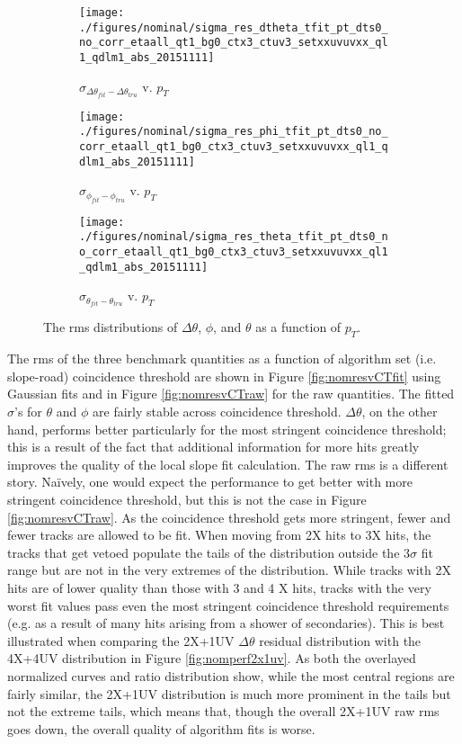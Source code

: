 \begin{figure}[!htbp]\captionsetup{justification=centering}\captionsetup{justification=centering}
  \begin{center}
  \begin{subfigure}{0.3\textwidth}\texttt{[image: ./figures/nominal/sigma\_res\_dtheta\_tfit\_pt\_dts0\_no\_corr\_etaall\_qt1\_bg0\_ctx3\_ctuv3\_setxxuvuvxx\_ql1\_qdlm1\_abs\_20151111]}\caption{$\sigma_{\Delta\theta_{fit}-\Delta\theta_{tru}}$ v. $p_T$}\end{subfigure}
  \begin{subfigure}{0.3\textwidth}\texttt{[image: ./figures/nominal/sigma\_res\_phi\_tfit\_pt\_dts0\_no\_corr\_etaall\_qt1\_bg0\_ctx3\_ctuv3\_setxxuvuvxx\_ql1\_qdlm1\_abs\_20151111]}\caption{$\sigma_{\phi_{fit}-\phi_{tru}}$ v. $p_T$}\end{subfigure}
  \begin{subfigure}{0.3\textwidth}\texttt{[image: ./figures/nominal/sigma\_res\_theta\_tfit\_pt\_dts0\_no\_corr\_etaall\_qt1\_bg0\_ctx3\_ctuv3\_setxxuvuvxx\_ql1\_qdlm1\_abs\_20151111]}\caption{$\sigma_{\theta_{fit}-\theta_{tru}}$ v. $p_T$}\end{subfigure}
  \caption{\label{fig:nomresvpt} The rms distributions of $\Delta\theta$, $\phi$, and $\theta$ as a function of $p_T$.}
  \end{center}
\end{figure}

The rms of the three benchmark quantities as a function of algorithm set (i.e. slope-road) coincidence threshold are shown in Figure \ref{fig:nomresvCTfit} using Gaussian fits and in Figure \ref{fig:nomresvCTraw} for the raw quantities.  The fitted $\sigma$'s for $\theta$ and $\phi$ are fairly stable across coincidence threshold.  $\Delta\theta$, on the other hand, performs better particularly for the most stringent coincidence threshold; this is a result of the fact that additional information for more hits greatly improves the quality of the local slope fit calculation.  The raw rms is a different story.  Na\"ively, one would expect the performance to get better with more stringent coincidence threshold, but this is not the case in Figure \ref{fig:nomresvCTraw}.  As the coincidence threshold gets more stringent, fewer and fewer tracks are allowed to be fit.  When moving from 2X hits to 3X hits, the tracks that get vetoed populate the tails of the distribution outside the 3$\sigma$ fit range but are not in the very extremes of the distribution.  While tracks with 2X hits are of lower quality than those with 3 and 4 X hits, tracks with the very worst fit values pass even the most stringent coincidence threshold requirements (e.g. as a result of many hits arising from a shower of secondaries).  This is best illustrated when comparing the 2X+1UV $\Delta\theta$ residual distribution with the 4X+4UV distribution in Figure \ref{fig:nomperf2x1uv}.  As both the overlayed normalized curves and ratio distribution show, while the most central regions are fairly similar, the 2X+1UV distribution is much more prominent in the tails but not the extreme tails, which means that, though the overall 2X+1UV raw rms goes down, the overall quality of algorithm fits is worse.

